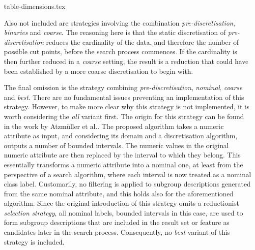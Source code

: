\documentclass[smallextended]{svjour3}
\newcommand{\dimension}{\emph}
\newcommand{\parameter}{\emph}
\newcommand{\predis}{\parameter{pre-discretisation}}
\newcommand{\binaries}{\parameter{binaries}}
\newcommand{\nominal}{\parameter{nominal}}
\newcommand{\coarse}{\parameter{coarse}}
\newcommand{\all}{\parameter{all}}
\newcommand{\best}{\parameter{best}}
\begin{document}
{table-dimensions.tex}

Also not included are strategies involving the combination \predis{}, \binaries{} and \coarse{}.
The reasoning here is that the static discretisation of \predis{} reduces the cardinality of the data, and therefore the number of possible cut points, before the search process commences.
If the cardinality is then further reduced in a \coarse{} setting, the result is a reduction that could have been established by a more coarse discretisation to begin with.

The final omission is the strategy combining \predis{}, \nominal{}, \coarse{} and \best{}.
There are no fundamental issues preventing an implementation of this strategy.
However, to make more clear why this strategy is not implemented, it is worth considering the \all{} variant first.
The origin for this strategy can be found in the work by Atzm\"{u}ller et al.\@ \cite{atzmueller:2012:vikamine}.
The proposed algorithm takes a numeric attribute as input, and considering its domain and a discretisation algorithm, outputs a number of bounded intervals.
The numeric values in the original numeric attribute are then replaced by the interval to which they belong.
This essentially transforms a numeric attribute into a nominal one, at least from the perspective of a search algorithm, where each interval is now treated as a nominal class label.
Customarily, no filtering is applied to subgroup descriptions generated from the same nominal attribute, and this holds also for the aforementioned algorithm.
Since the original introduction of this strategy omits a reductionist \dimension{selection strategy}, all nominal labels, bounded intervals in this case, are used to form subgroup descriptions that are included in the result set or feature as candidates later in the search process.
Consequently, no \best{} variant of this strategy is included.
\end{document}
